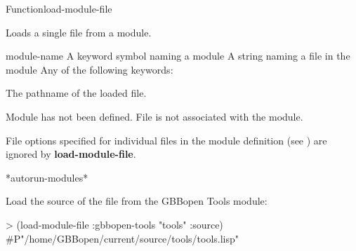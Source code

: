 \documentclass[10pt,twoside,english,pdftex]{article}
\begin{document}
\begin{functiondoc}{Function}{load-module-file}{   
    \returns{} }
%
% 

\fnsyntax 

\fnpurpose Loads a single file from a module.

\fnpackage {}

\fnmodule {}

\fnargs
\begin{args}{module-name}
 A keyword symbol naming a module 
 A string naming a file in the module 
\arg[option] Any of the following keywords: 
\loadonefilemoduleoptions
\end{args}

\fnreturns The pathname of the loaded file.

\fnerrors Module  has not been defined.  File
 is not associated with the module.

\fndescription File options specified for individual files in the module
definition (see \textbf{}) are ignored by
\textbf{load-module-file}.

\begin{alsos}{*autorun-modules*}
\end{alsos}

\fnexample Load the source of the file  from the GBBopen
Tools module:
\begin{example}
> (load-module-file :gbbopen-tools "tools" :source)
#P"/home/GBBopen/current/source/tools/tools.lisp"
\end{example}

\end{functiondoc}

\end{document}
